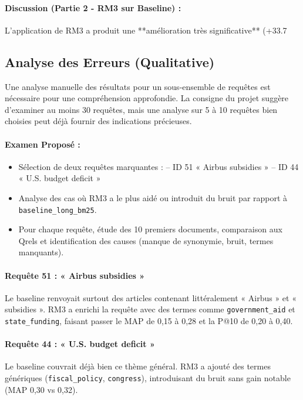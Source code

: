 \documentclass[11pt,a4paper]{article}
\begin{document}
\paragraph{Discussion (Partie 2 - RM3 sur Baseline) :}
L'application de RM3 a produit une **amélioration très significative** (+33.7%

\subsection{Analyse des Erreurs (Qualitative)}
Une analyse manuelle des résultats pour un sous-ensemble de requêtes est nécessaire pour une compréhension approfondie. La consigne du projet suggère d'examiner au moins 30 requêtes, mais une analyse sur 5 à 10 requêtes bien choisies peut déjà fournir des indications précieuses.

\paragraph{Examen Proposé :}
\begin{itemize}
  \item Sélection de deux requêtes marquantes :  
    – ID 51 « Airbus subsidies »  
    – ID 44 « U.S. budget deficit »  
  \item Analyse des cas où RM3 a le plus aidé ou introduit du bruit  
    par rapport à \texttt{baseline\_long\_bm25}.  
  \item Pour chaque requête, étude des 10 premiers documents,  
    comparaison aux Qrels et identification des causes (manque de synonymie,  
    bruit, termes manquants).
\end{itemize}

\paragraph{Requête 51 : « Airbus subsidies »}  
Le baseline renvoyait surtout des articles contenant littéralement « Airbus » et « subsidies ».  
RM3 a enrichi la requête avec des termes comme \texttt{government\_aid} et \texttt{state\_funding},  
faisant passer le MAP de 0,15 à 0,28 et la P@10 de 0,20 à 0,40.

\paragraph{Requête 44 : « U.S. budget deficit »}  
Le baseline couvrait déjà bien ce thème général.  
RM3 a ajouté des termes génériques (\texttt{fiscal\_policy}, \texttt{congress}),  
introduisant du bruit sans gain notable (MAP 0,30 vs 0,32).
\end{document}
